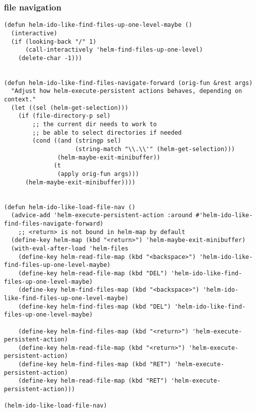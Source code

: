 \documentclass[11pt]{article}
\begin{document}
\subsubsection{file navigation}
\label{sec-2-2-3}
\begin{verbatim}
(defun helm-ido-like-find-files-up-one-level-maybe ()
  (interactive)
  (if (looking-back "/" 1)
      (call-interactively 'helm-find-files-up-one-level)
    (delete-char -1)))


(defun helm-ido-like-find-files-navigate-forward (orig-fun &rest args)
  "Adjust how helm-execute-persistent actions behaves, depending on context."
  (let ((sel (helm-get-selection)))
    (if (file-directory-p sel)
        ;; the current dir needs to work to
        ;; be able to select directories if needed
        (cond ((and (stringp sel)
                    (string-match "\\.\\'" (helm-get-selection)))
               (helm-maybe-exit-minibuffer))
              (t
               (apply orig-fun args)))
      (helm-maybe-exit-minibuffer))))


(defun helm-ido-like-load-file-nav ()
  (advice-add 'helm-execute-persistent-action :around #'helm-ido-like-find-files-navigate-forward)
    ;; <return> is not bound in helm-map by default
  (define-key helm-map (kbd "<return>") 'helm-maybe-exit-minibuffer)
  (with-eval-after-load 'helm-files
    (define-key helm-read-file-map (kbd "<backspace>") 'helm-ido-like-find-files-up-one-level-maybe)
    (define-key helm-read-file-map (kbd "DEL") 'helm-ido-like-find-files-up-one-level-maybe)
    (define-key helm-find-files-map (kbd "<backspace>") 'helm-ido-like-find-files-up-one-level-maybe)
    (define-key helm-find-files-map (kbd "DEL") 'helm-ido-like-find-files-up-one-level-maybe)

    (define-key helm-find-files-map (kbd "<return>") 'helm-execute-persistent-action)
    (define-key helm-read-file-map (kbd "<return>") 'helm-execute-persistent-action)
    (define-key helm-find-files-map (kbd "RET") 'helm-execute-persistent-action)
    (define-key helm-read-file-map (kbd "RET") 'helm-execute-persistent-action)))

(helm-ido-like-load-file-nav)
\end{verbatim}
\end{document}

